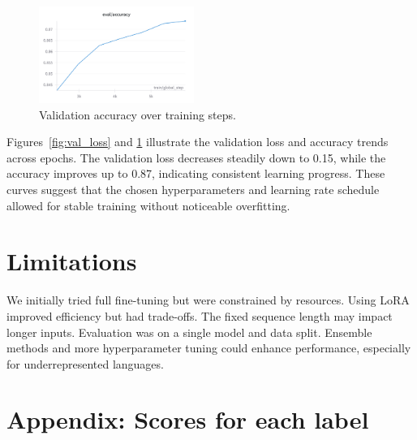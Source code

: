 \documentclass[11pt]{article}
\begin{document}
\begin{figure}[H]
    \centering
    \includegraphics[width=0.45\textwidth]{figures/new_ANLP_kaggle_validation_accuracy_over_epochs.png}
    \caption{Validation accuracy over training steps.}
    \label{fig:val_accuracy}
\end{figure}

Figures~\ref{fig:val_loss} and \ref{fig:val_accuracy} illustrate the validation loss and accuracy trends across epochs. The validation loss decreases steadily down to 0.15, while the accuracy improves up to 0.87, indicating consistent learning progress. These curves suggest that the chosen hyperparameters and learning rate schedule allowed for stable training without noticeable overfitting.

\section*{Limitations}

We initially tried full fine-tuning but were constrained by resources. Using LoRA improved efficiency but had trade-offs. The fixed sequence length may impact longer inputs. Evaluation was on a single model and data split. Ensemble methods and more hyperparameter tuning could enhance performance, especially for underrepresented languages.



\clearpage
\appendix
\onecolumn
\section*{Appendix: Scores for each label}
\end{document}
